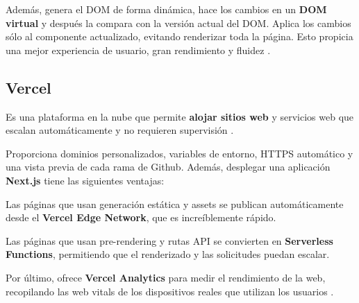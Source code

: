 \documentclass[12pt,twoside,titlepage]{report}
\begin{document}
Además, genera el DOM de forma dinámica, hace los cambios en un \textbf{DOM virtual} y después la compara con la versión actual del DOM. Aplica los cambios sólo al componente actualizado, evitando renderizar toda la página. Esto propicia una mejor experiencia de usuario, gran rendimiento y fluidez \cite{react2}.

\subsection{Vercel}
\label{sec:Vercel}

Es una plataforma en la nube que permite \textbf{alojar sitios web} y servicios web que escalan automáticamente y no requieren supervisión \cite{vercel1}. %

Proporciona dominios personalizados, variables de entorno, HTTPS automático y una vista previa de cada rama de Github.
Además, desplegar una aplicación \textbf{Next.js} tiene las siguientes ventajas:

\begin{compactitem}
    \item Las páginas que usan generación estática y assets se publican automáticamente desde el \textbf{Vercel Edge Network}, que es increíblemente rápido.
    \item Las páginas que usan pre-rendering y rutas API se convierten en \textbf{Serverless Functions}, permitiendo que el renderizado y las solicitudes puedan escalar.
\end{compactitem}

Por último, ofrece \textbf{Vercel Analytics} para medir el rendimiento de la web, recopilando las web vitals de los dispositivos reales que utilizan los usuarios \cite{vercelAnalytics}.
\end{document}
